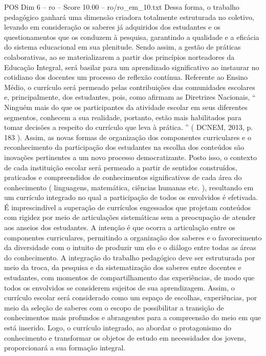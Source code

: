 \begin{textsample}{POS Dim 6 – ro – Score 10.00 – ro/ro\_em\_10.txt}
Dessa forma, o trabalho pedagógico ganhará uma dimensão criadora totalmente estruturada no coletivo, levando em consideração os saberes já adquiridos dos estudantes e os questionamentos que os conduzem à pesquisa, garantindo a qualidade e a eficácia do sistema educacional em sua plenitude.
Sendo assim, a gestão de práticas colaborativas, ao se materializarem a partir dos princípios norteadores da Educação Integral, será basilar para um aprendizado significativo ao instaurar no cotidiano dos docentes um processo de reflexão contínua.
Referente ao Ensino Médio, o currículo será permeado pelas contribuições das comunidades escolares e, principalmente, dos estudantes, pois, como afirmam as Diretrizes Nacionais, “ Ninguém mais do que os participantes da atividade escolar em seus diferentes segmentos, conhecem a sua realidade, portanto, estão mais habilitados para tomar decisões a respeito do currículo que leva à prática. ” ( DCNEM, 2013, p. 183 ).
Assim, as novas formas de organização dos componentes curriculares e o reconhecimento da participação dos estudantes na escolha dos conteúdos são inovações pertinentes a um novo processo democratizante.
Posto isso, o contexto de cada instituição escolar será permeado a partir de sentidos construídos, praticados e compreendidos de conhecimentos significativos de cada área do conhecimento ( linguagens, matemática, ciências humanas etc. ), resultando em um currículo integrado no qual a participação de todos os envolvidos é efetivada.
É imprescindível a superação de currículos engessados que projetam conteúdos com rigidez por meio de articulações sistemáticas sem a preocupação de atender aos anseios dos estudantes.
A intenção é que ocorra a articulação entre os componentes curriculares, permitindo a organização dos saberes e o favorecimento da diversidade com o intuito de produzir um elo e o diálogo entre todas as áreas do conhecimento.
A integração do trabalho pedagógico deve ser estruturada por meio da troca, da pesquisa e da sistematização dos saberes entre docentes e estudantes, com momentos de compartilhamento das experiências, de modo que todos os envolvidos se considerem sujeitos de sua aprendizagem.
Assim, o currículo escolar será considerado como um espaço de escolhas, experiências, por meio da seleção de saberes com o escopo de possibilitar a transição de conhecimentos mais profundos e abrangentes para a compreensão do meio em que está inserido.
Logo, o currículo integrado, ao abordar o protagonismo do conhecimento e transformar os objetos de estudo em necessidades dos jovens, proporcionará a sua formação integral.

\end{textsample}
